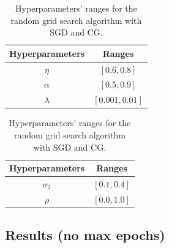         \begin{table}[H]
          \centering
          \caption{Hyperparameters' ranges for the random grid search algorithm with SGD and CG.}
          \begin{minipage}{.4\textwidth}
              \centering
              \begin{tabular}{| c | c |}
                    \hline
                    Hyperparameters & Ranges\\
                    \hline
                    $\eta$ & $\left [0.6, 0.8 \right ]$ \\
                    \hline
                    $\alpha$ & $[0.5, 0.9]$ \\
                    \hline
                    $\lambda$ & $[0.001, 0.01]$ \\
                    \hline
              \end{tabular}
          \end{minipage}
          \begin{minipage}{.4\textwidth}
              \centering
              \begin{tabular}{| c | c |}
                    \hline
                    Hyperparameters & Ranges\\
                    \hline
                    $\sigma_2$ & $\left [0.1, 0.4 \right ]$ \\
                    \hline
                    $\rho$ & $[0.0, 1.0]$ \\
                    \hline
              \end{tabular}
            \end{minipage}
            \label{tab:hyper_monk}
        \end{table}

        \subsection{Results (no max epochs)} %
        \label{sub:results_}

